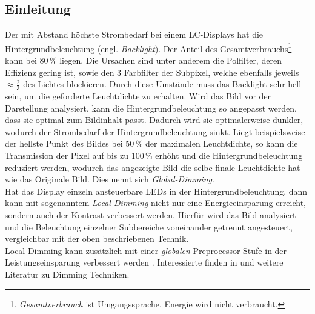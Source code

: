 \subsection*{Einleitung}
Der mit Abstand höchste Strombedarf bei einem LC-Displays hat die Hintergrundbeleuchtung (engl. \emph{Backlight}). Der Anteil des Gesamtverbrauchs\footnote{\emph{Gesamtverbrauch} ist Umgangssprache. Energie wird nicht verbraucht.} kann bei 80\,\% liegen. Die Ursachen sind unter anderem die Polfilter, deren Effizienz gering ist, sowie den 3 Farbfilter der Subpixel, welche ebenfalls jeweils $ \approx\frac{2}{3} $ des Lichtes blockieren. Durch diese Umstände muss das Backlight sehr hell sein, um die geforderte Leuchtdichte zu erhalten.
Wird das Bild vor der Darstellung analysiert, kann die Hintergrundbeleuchtung so angepasst werden, dass sie optimal zum Bildinhalt passt. Dadurch wird sie optimalerweise dunkler, wodurch der Strombedarf der Hintergrundbeleuchtung sinkt.
Liegt beispielsweise der hellste Punkt des Bildes bei 50\,\% der maximalen Leuchtdichte, so kann die Transmission der Pixel auf bis zu 100\,\% erhöht und die Hintergrundbeleuchtung reduziert werden, wodurch das angezeigte Bild die selbe finale Leuchtdichte hat wie das Originale Bild. Dies nennt sich \textit{Global-Dimming}.\\
Hat das Display einzeln ansteuerbare LEDs in der Hintergrundbeleuchtung, dann kann mit sogenanntem \textit{Local-Dimming} nicht nur eine Energieeinsparung erreicht, sondern auch der Kontrast verbessert werden. Hierfür wird das Bild analysiert und die Beleuchtung einzelner Subbereiche voneinander getrennt angesteuert, vergleichbar mit der oben beschriebenen Technik.\\
Local-Dimming kann zusätzlich mit einer \emph{globalen} Preprocessor-Stufe in der Leistungseinsparung verbessert werden \cite{Schmidt_SID15}. Interessierte finden in \cite{Chen2007} und \cite{Albrecht2010} weitere Literatur zu Dimming Techniken.